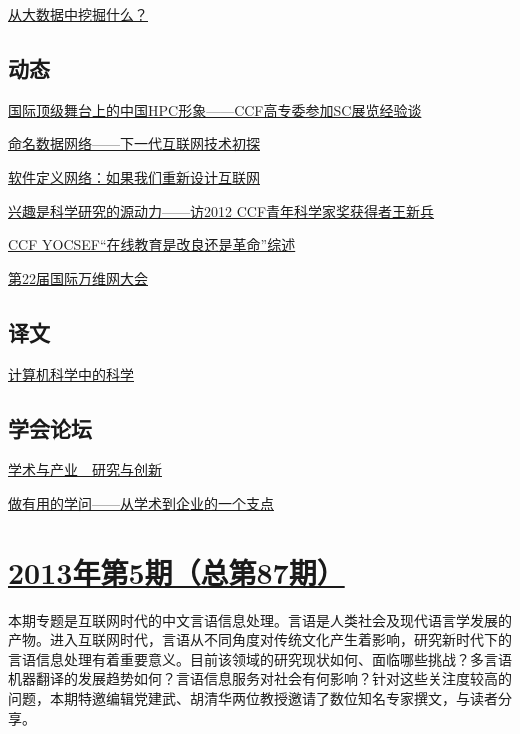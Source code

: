 \documentclass[a4paper]{article}
\begin{document}
\href{http://history.ccf.org.cn/resources/1190201776262/2013/06/17/6.pdf}{从大数据中挖掘什么？}

\subsection{动态}
\href{http://history.ccf.org.cn/resources/1190201776262/2013/06/18/11.pdf}{国际顶级舞台上的中国HPC形象——CCF高专委参加SC展览经验谈}

\href{http://history.ccf.org.cn/resources/1190201776262/2013/06/18/13.pdf}{命名数据网络——下一代互联网技术初探}

\href{http://history.ccf.org.cn/resources/1190201776262/2013/06/18/14.pdf}{软件定义网络：如果我们重新设计互联网}

\href{http://history.ccf.org.cn/resources/1190201776262/2013/06/18/10.pdf}{兴趣是科学研究的源动力——访2012 CCF青年科学家奖获得者王新兵}

\href{http://history.ccf.org.cn/resources/1190201776262/2013/06/18/15.pdf}{CCF YOCSEF“在线教育是改良还是革命”综述}

\href{http://history.ccf.org.cn/resources/1190201776262/2013/06/18/12.pdf}{第22届国际万维网大会}

\subsection{译文}
\href{http://history.ccf.org.cn/resources/1190201776262/2013/06/18/16.pdf}{计算机科学中的科学}

\subsection{学会论坛}
\href{http://history.ccf.org.cn/resources/1190201776262/2013/06/18/17.pdf}{学术与产业　研究与创新}

\href{http://history.ccf.org.cn/resources/1190201776262/2013/06/18/18.pdf}{做有用的学问——从学术到企业的一个支点}


\section{\href{http://history.ccf.org.cn/sites/ccf/jsjtbbd.jsp?contentId=2736780528206}{\textbf{2013年第5期（总第87期）}}}
本期专题是互联网时代的中文言语信息处理。言语是人类社会及现代语言学发展的产物。进入互联网时代，言语从不同角度对传统文化产生着影响，研究新时代下的言语信息处理有着重要意义。目前该领域的研究现状如何、面临哪些挑战？多言语机器翻译的发展趋势如何？言语信息服务对社会有何影响？针对这些关注度较高的问题，本期特邀编辑党建武、胡清华两位教授邀请了数位知名专家撰文，与读者分享。
\end{document}
